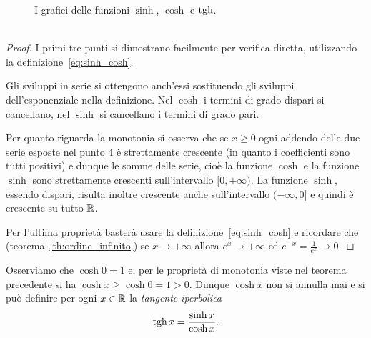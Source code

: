 \newsavebox{\qrfigiperb}%
\begin{figure}
  \centering%
  \caption{%
    I grafici delle funzioni $\sinh$, $\cosh$ e $\tgh$.
    \ifwidemargin\\\\\fi%
    \usebox{\qrfigiperb}%
  }
\end{figure}

\begin{proof}
I primi tre punti si dimostrano facilmente per verifica diretta,
utilizzando la definizione~\eqref{eq:sinh_cosh}.

Gli sviluppi in serie si ottengono anch'essi sostituendo
gli sviluppi dell'esponenziale nella definizione.
Nel $\cosh$ i termini di grado dispari si cancellano, nel $\sinh$ si cancellano
i termini di grado pari.

Per quanto riguarda la monotonia si osserva che se $x\ge 0$ ogni
addendo delle due serie esposte nel punto 4 è strettamente crescente
(in quanto i coefficienti sono tutti positivi) e dunque le somme delle serie,
cioè la funzione $\cosh$ e la funzione $\sinh$ sono strettamente crescenti
sull'intervallo $[0,+\infty)$. La funzione $\sinh$, essendo dispari,
risulta inoltre crescente anche sull'intervallo $(-\infty,0]$ e quindi
è crescente su tutto ${\mathbb R}$.

Per l'ultima proprietà basterà usare la definizione~\eqref{eq:sinh_cosh}
e ricordare che (teorema~\ref{th:ordine_infinito})
se $x\to +\infty$ allora
$e^x\to +\infty$ ed $e^{-x}=\frac{1}{e^{x}} \to 0$.
\end{proof}

Osserviamo che $\cosh 0 = 1$ e, per le proprietà di monotonia viste nel teorema
precedente si ha $\cosh x \ge \cosh 0 = 1 > 0$. Dunque $\cosh x$ non si annulla
mai e si può definire per ogni $x\in {\mathbb R}$ la \emph{tangente iperbolica}
%
\mymargin{$\tgh$}%
\index{$\tgh$}%
\[
    \operatorname{tgh} x = \frac{\sinh x}{\cosh x}.
\]

